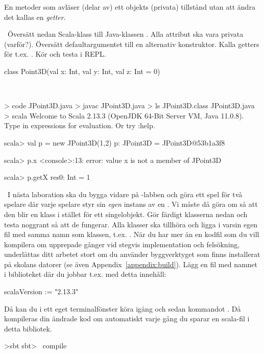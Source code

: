 \SubtaskSolved En metoder som avläser (delar av) ett objekts (privata) tillstånd utan att ändra det kallas en \emph{getter}.

\QUESTEND



\QUESTBEGIN

\Task \what~Översätt nedan Scala-klass till Java-klassen . Alla attribut ska vara privata (varför?). Översätt defaultargumentet till en alternativ konstruktor. Kalla getters för t.ex. . Kör  och testa i REPL.

\begin{Code}
class Point3D(val x: Int, val y: Int, val z: Int = 0)
\end{Code}

\SOLUTION

\TaskSolved \what~


\begin{REPL}
> code JPoint3D.java
> javac JPoint3D.java
> ls
JPoint3D.class  JPoint3D.java
> scala
Welcome to Scala 2.13.3 (OpenJDK 64-Bit Server VM, Java 11.0.8).
Type in expressions for evaluation. Or try :help.

scala> val p = new JPoint3D(1,2)
p: JPoint3D = JPoint3D@53b1a3f8

scala> p.x
<console>:13: error: value x is not a member of JPoint3D

scala> p.getX
res0: Int = 1
\end{REPL}

\QUESTEND



\QUESTBEGIN

\Task\label{exe:classes:labprep}  \what~I nästa laboration ska du bygga vidare på -labben och göra ett spel för två spelare där varje spelare styr sin \emph{egen} instans av en . Vi måste då göra om  så att den blir en klass i stället för ett singelobjekt. Gör färdigt klasserna nedan och testa noggrant så att de fungerar. Alla klasser ska tillhöra  och ligga i varsin egen fil med samma namn som klassen, t.ex. . När du har mer än en kodfil som du vill kompilera om upprepade gånger vid stegvis implementation och felsökning, underlättas ditt arbetet stort om du använder byggverktyget  som finns installerat på skolans datorer (se även Appendix~\ref{appendix:build}). Lägg en fil med namnet  i biblioteket där du jobbar t.ex.  med detta innehåll:
\begin{Code}
scalaVersion := "2.13.3"
\end{Code}
Då kan du i ett eget terminalfönster köra igång  och sedan kommandot . Då kompileras din ändrade kod om automatiskt varje gång du sparar en scala-fil i detta bibliotek.
\begin{REPLnonum}
>sbt
sbt> ~compile
\end{REPLnonum}

